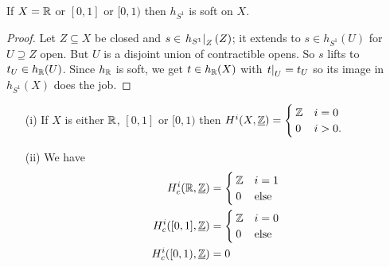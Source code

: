 \documentclass[../main.tex]{subfiles}
\begin{document}
\begin{lem}
    If $X = \mathbb{R}$ or $[0,1]$ or $[0,1)$ then $h_{S^1}$ is soft on $X$.
\end{lem}

\begin{proof}
    Let $Z\subseteq X$ be closed and $s\in \left.h_{S^1}\right|_{Z}(Z)$; it extends to $s\in h_{S^1}(U)$ for $U\supseteq Z$ open. But $U$ is a disjoint union of contractible opens. So $s$ lifts to $t_U \in h_{\mathbb{R}}(U)$. Since $h_{\mathbb{R}}$ is soft, we get $t\in h_{\mathbb{R}}(X)$ with $\left.t\right|_{U} = t_U$ so its image in $h_{S^1}(X)$ does the job.
\end{proof}

\begin{cor}
    \leavevmode
    \begin{enumerate}
        \item[(i)] If $X$ is either $\mathbb{R}$, $[0,1]$ or $[0,1)$ then $H^i(X, \underline{\mathbb{Z}}) = \begin{cases}
            \mathbb{Z} & i = 0 \\ 
            0 & i>0.
        \end{cases}$
        \item[(ii)] We have
        \begin{align*}
            H^i_c(\mathbb{R}, \underline{\mathbb{Z}}) &= \begin{cases}
                \mathbb{Z} & i = 1 \\
                0 & \text{else}
            \end{cases} \\
            H^i_c([0,1], \underline{\mathbb{Z}}) &= \begin{cases}
                \mathbb{Z} & i = 0 \\
                0 & \text{else}
            \end{cases} \\
            H^i_c([0,1), \underline{\mathbb{Z}}) &= 0
        \end{align*}
    \end{enumerate}
\end{cor}
\end{document}
